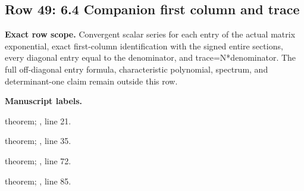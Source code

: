 \subsection{Row 49: 6.4 Companion first column and trace}
\label{row:49}
\textbf{Exact row scope.} Convergent scalar series for each entry of the actual matrix exponential, exact first-column identification with the signed entire sections, every diagonal entry equal to the denominator, and trace=N*denominator. The full off-diagonal entry formula, characteristic polynomial, spectrum, and determinant-one claim remain outside this row.\par\smallskip
\textbf{Manuscript labels.} \par\smallskip
{\small{}\par}
{\footnotesize\color{muted}theorem; , line 21.\par}\smallskip
{\small{}\par}
{\footnotesize\color{muted}theorem; , line 35.\par}\smallskip
{\small{}\par}
{\footnotesize\color{muted}theorem; , line 72.\par}\smallskip
{\small{}\par}
{\footnotesize\color{muted}theorem; , line 85.\par}\smallskip
{}
